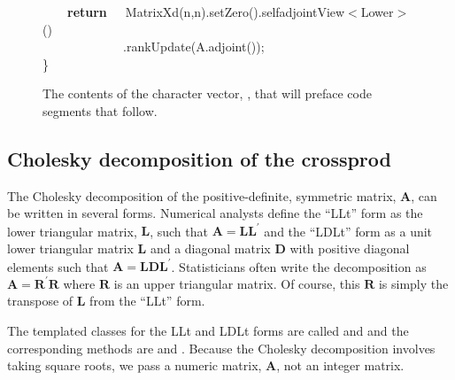 \documentclass[shortnames,article,nojss]{jss}
\newcommand{\hlstd}[1]{\textcolor[rgb]{0,0,0}{#1}}
\newcommand{\hlopt}[1]{\textcolor[rgb]{0,0,0}{#1}}
\newcommand{\hlkwa}[1]{\textcolor[rgb]{0.61,0.13,0.93}{\bf{#1}}}
\newcommand{\hlkwd}[1]{\textcolor[rgb]{0,0,0}{#1}}
\begin{document}
\begin{figure}[htb]
  \hlstd{}\hlstd{\ \ \ \ }\hlstd{}\hlkwa{return}\hlstd{\ \ \ }\hlkwa{}\hlstd{}\hlkwd{MatrixXd}\hlstd{}\hlopt{(}\hlstd{n}\hlopt{,}\hlstd{n}\hlopt{).}\hlstd{}\hlkwd{setZero}\hlstd{}\hlopt{().}\hlstd{selfadjointView}\hlopt{$<$}\hlstd{Lower}\hlopt{$>$()}\hspace*{\fill}\\
  \hlstd{}\hlstd{\ \ \ \ \ \ \ \ \ \ \ \ \ }\hlstd{}\hlopt{.}\hlstd{}\hlkwd{rankUpdate}\hlstd{}\hlopt{(}\hlstd{A}\hlopt{.}\hlstd{}\hlkwd{adjoint}\hlstd{}\hlopt{());}\hspace*{\fill}\\
  \hlstd{}\hlopt{\}}\hlstd{}\hspace*{\fill}\\
  \mbox{}
  \normalfont
  \normalsize
  \caption{The contents of the character vector, , that will preface  code segments that follow.}
  \label{fig:incl}
\end{figure}

\subsection{Cholesky decomposition of the crossprod}
\label{sec:chol}

The Cholesky decomposition of the positive-definite, symmetric matrix,
$\bm A$, can be written in several forms.  Numerical analysts define
the ``LLt'' form as the lower triangular matrix, $\bm L$, such that
$\bm A=\bm L\bm L^\prime$ and the ``LDLt'' form as a unit lower
triangular matrix $\bm L$ and a diagonal matrix $\bm D$ with positive
diagonal elements such that $\bm A=\bm L\bm D\bm L^\prime$.
Statisticians often write the decomposition as $\bm A=\bm R^\prime\bm
R$ where $\bm R$ is an upper triangular matrix.  Of course, this $\bm
R$ is simply the transpose of $\bm L$ from the ``LLt'' form.

The templated  classes for the LLt and LDLt forms are
called  and  and the corresponding methods are
 and .
Because the Cholesky decomposition involves taking square roots, we
pass a numeric matrix, $\bm A$, not an integer matrix.
\end{document}
